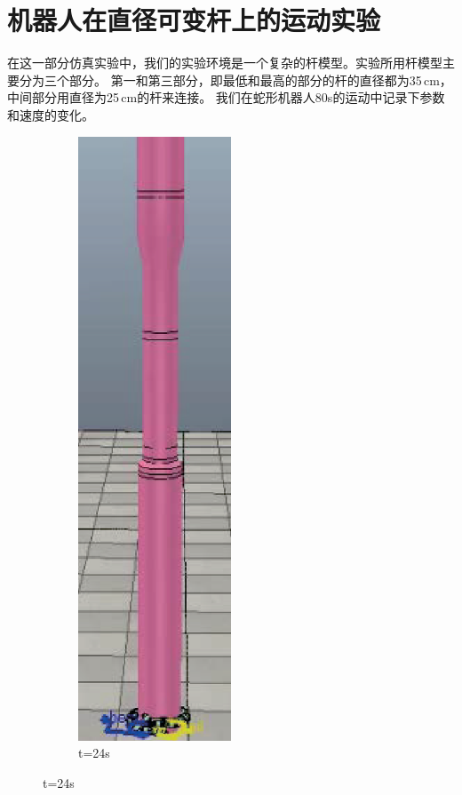 \section{机器人在直径可变杆上的运动实验}
在这一部分仿真实验中，我们的实验环境是一个复杂的杆模型。实验所用杆模型主要分为三个部分。 第一和第三部分，即最低和最高的部分的杆的直径都为35\,cm，中间部分用直径为25\,cm的杆来连接。 我们在蛇形机器人80s的运动中记录下参数和速度的变化。
\begin{figure}[htbp]
	\centering
	\begin{subfigure}{0.3\textwidth}{
			\centering
			\includegraphics[height=0.18\textheight,width=0.5\textwidth]{figure/chap05/BSB/34s.eps}
			\caption{t=24s}
		}

\end{subfigure}
\end{figure}
